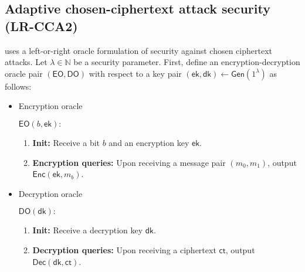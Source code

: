 \documentclass[11pt,letterpaper]{article}
\newcommand{\authnote}[2]{[{\color{red}\textbf{#1:}}~{\color{blue} #2}]}
\newcommand{\authnote}[2]{}
\newcommand{\megan}[1]{\authnote{Megan}{#1}}
\theoremstyle{plain} %
\theoremstyle{definition} %
\theoremstyle{remark} %
\newcommand{\eqdef}{\ {:=} \ }
\newcommand{\SecParam}{\lambda}
\newcommand{\Gen}{\mathsf{Gen}}
\newcommand{\Enc}{\mathsf{Enc}}
\newcommand{\OblivEnc}{\mathsf{OblivEnc}}
\newcommand{\Dec}{\mathsf{Dec}}
\newcommand{\EncKey}{\mathsf{ek}}
\newcommand{\DecKey}{\mathsf{dk}}
\newcommand{\ChallengerBit}{b}
\newcommand{\EncOracle}{\mathsf{EO}}
\newcommand{\DecOracle}{\mathsf{DO}}
\newcommand{\Msg}{m}
\newcommand{\Ct}{\mathsf{ct}}
\newcommand{\Rand}{r}
\newcommand{\Distribution}{\mathcal{D}}
\newcommand{\RandSpace}{\mathcal{R}}
\newcommand{\Naturals}{\mathbb{N}}
\begin{document}
%
%

\subsection{Adaptive chosen-ciphertext attack security (LR-CCA2)}
\label{sec:lr-cca2}
\cite{CanettiF01} uses a left-or-right oracle formulation of security against chosen ciphertext attacks. Let $\SecParam\in\Naturals$ be a security parameter. First, define an encryption-decryption oracle pair $(\EncOracle, \DecOracle)$ with respect to a key pair $(\EncKey,\DecKey) \gets \Gen(1^\SecParam)$ as follows:
\begin{itemize}
	\item Encryption oracle

	\begin{minipage}{0.9\textwidth}
	$\EncOracle(\ChallengerBit,\EncKey):$
	\begin{enumerate}[nolistsep]
		\item \textbf{Init:} Receive a bit $\ChallengerBit$ and an encryption key $\EncKey$.
		\item \textbf{Encryption queries:} Upon receiving a message pair $(\Msg_0, \Msg_1)$, output $\Enc(\EncKey,\Msg_{\ChallengerBit})$.
	\end{enumerate}
	\end{minipage}

	\item Decryption oracle

	\begin{minipage}{0.9\textwidth}
	$\DecOracle(\DecKey):$
	\begin{enumerate}[nolistsep]
		\item \textbf{Init:} Receive a decryption key $\DecKey$.
		\item \textbf{Decryption queries:} Upon receiving a ciphertext $\Ct$, output $\Dec(\DecKey,\Ct)$.
	\end{enumerate}
	\end{minipage}
\end{itemize}
\end{document}
